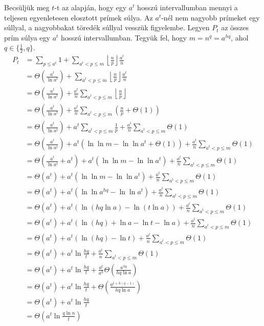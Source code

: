 \documentclass[12pt]{report}
\begin{document}
Becsüljük meg $t$-t az alapján, hogy egy $a^t$ hosszú intervallumban
mennyi a teljesen egyenletesen elosztott prímek súlya.
Az $a^t$-nél nem nagyobb prímeket egy súllyal,
a nagyobbakat töredék súllyal vesszük figyelembe.
Legyen $P_t$ az összes prím súlya egy $a^t$ hosszú intervallumban.
Tegyük fel, hogy $m = n^q = a^{hq}$, ahol $q \in \{\frac{1}{2}, q\}$.
\begin{align*}
P_t
&= \sum_{p \le a^t} 1
  + \sum_{a^t < p \le m} \left\lfloor \frac{n}{p} \right\rfloor \frac{a^t}{n} \\
&= \Theta\left( \frac{a^t}{\ln{a^t}} \right)
  + \sum_{a^t < p \le m} \left\lfloor \frac{n}{p} \right\rfloor \frac{a^t}{n} \\
&= \Theta\left( \frac{a^t}{\ln{a^t}} \right)
  + \frac{a^t}{n} \sum_{a^t < p \le m} \left\lfloor \frac{n}{p} \right\rfloor \\
&= \Theta\left( \frac{a^t}{\ln{a^t}} \right)
  + \frac{a^t}{n} \sum_{a^t < p \le m} \left( \frac{n}{p} + \Theta(1) \right) \\
&= \Theta\left( \frac{a^t}{\ln{a^t}} \right)
  + a^t \sum_{a^t < p \le m} \frac{1}{p}
  + \frac{a^t}{n} \sum_{a^t < p \le m} \Theta(1) \\
&= \Theta\left( \frac{a^t}{\ln{a^t}} \right)
  + a^t \left( \ln{\ln{m}} - \ln{\ln{a^t}} + \Theta(1) \right)
  + \frac{a^t}{n} \sum_{a^t < p \le m} \Theta(1) \\
&= \Theta\left( \frac{a^t}{\ln{a^t}} + a^t \right)
  + a^t \left( \ln{\ln{m}} - \ln{\ln{a^t}} \right)
  + \frac{a^t}{n} \sum_{a^t < p \le m} \Theta(1) \\
&= \Theta\left( a^t \right)
  + a^t \left( \ln{\ln{m}} - \ln{\ln{a^t}} \right)
  + \frac{a^t}{n} \sum_{a^t < p \le m} \Theta(1) \\
&= \Theta\left( a^t \right)
  + a^t \left( \ln{\ln{a^{hq}}} - \ln{\ln{a^t}} \right)
  + \frac{a^t}{n} \sum_{a^t < p \le m} \Theta(1) \\
&= \Theta\left( a^t \right)
  + a^t \left( \ln{(hq \ln{a})} - \ln{(t \ln{a})} \right)
  + \frac{a^t}{n} \sum_{a^t < p \le m} \Theta(1) \\
&= \Theta\left( a^t \right)
  + a^t \left( \ln{(hq)} + \ln{a} - \ln{t} - \ln{a} \right)
  + \frac{a^t}{n} \sum_{a^t < p \le m} \Theta(1) \\
&= \Theta\left( a^t \right)
  + a^t \left( \ln{(hq)} - \ln{t} \right)
  + \frac{a^t}{n} \sum_{a^t < p \le m} \Theta(1) \\
&= \Theta\left( a^t \right)
  + a^t \ln{\frac{hq}{t}}
  + \frac{a^t}{n} \sum_{a^t < p \le m} \Theta(1) \\
&= \Theta\left( a^t \right)
  + a^t \ln{\frac{hq}{t}}
  + \frac{a^t}{a^h} \Theta\left( \frac{a^{hq}}{hq \ln{a}} \right) \\
&= \Theta\left( a^t \right)
  + a^t \ln{\frac{hq}{t}}
  + \Theta\left( \frac{a^{t+h(q-1)}}{hq \ln{a}} \right) \\
&= \Theta\left( a^t \right)
  + a^t \ln{\frac{hq}{t}} \\
&= \Theta\left( a^t \ln{\frac{q \ln{n}}{t}} \right)
\end{align*}
\end{document}
